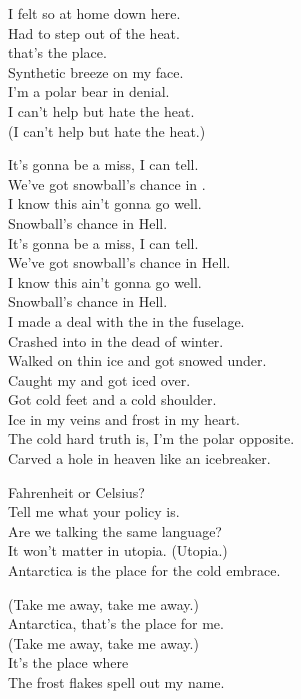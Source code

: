 I felt so at home down here. \\
Had to step out of the heat. \\
 that's the place. \\
Synthetic breeze on my face. \\
I'm a polar bear in denial. \\
I can't help but hate the heat. \\
(I can't help but hate the heat.) \\


It's gonna be a miss, I can tell. \\
We've got snowball's chance in . \\
I know this ain't gonna go well. \\
Snowball's chance in Hell. \\
It's gonna be a miss, I can tell. \\
We've got snowball's chance in Hell. \\
I know this ain't gonna go well. \\
Snowball's chance in Hell. \\

I made a deal with the  in the fuselage. \\
Crashed into  in the dead of winter. \\
Walked on thin ice and got snowed under. \\
Caught my  and got iced over. \\
Got cold feet and a cold shoulder. \\
Ice in my veins and frost in my heart. \\
The cold hard truth is, I'm the polar opposite. \\
Carved a hole in heaven like an icebreaker. \\


Fahrenheit or Celsius? \\
Tell me what your policy is. \\
Are we talking the same language? \\
It won't matter in utopia. (Utopia.) \\
Antarctica is the place for the cold embrace. \\


(Take me away, take me away.) \\
Antarctica, that's the place for me. \\
(Take me away, take me away.) \\
It's the place where \\
The frost flakes spell out my name. \\

